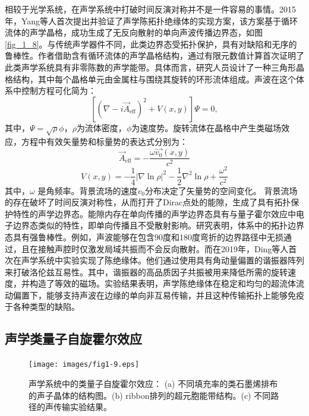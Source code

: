 相较于光学系统，在声学系统中打破时间反演对称并不是一件容易的事情。2015年，Yang等人首次提出并验证了声学陈拓扑绝缘体的实现方案\cite{i1}，该方案基于循环流体的声学晶格，成功生成了无反向散射的单向声波传播边界态，如图\ref{fig_1_8}。与传统声学器件不同，此类边界态受拓扑保护，具有对缺陷和无序的鲁棒性。作者借助含有循环流体的声学晶格结构，通过有限元数值计算首次证明了此类声学系统具有非零陈数的声学能带。具体而言，研究人员设计了一种三角形晶格结构，其中每个晶格单元由金属柱与围绕其旋转的环形流体组成。声波在这个体系中控制方程可化简为：
\begin{equation} \label{eq1-10}
    \left[ (\nabla - i \vec{A}_{\text{eff}})^2 + V(x, y) \right] \Psi = 0,
\end{equation}  
其中，$\Psi = \sqrt{\rho} \phi$，$\rho$为流体密度，$\phi$为速度势。旋转流体在晶格中产生类磁场效应，方程中有效矢量势和标量势的表达式分别为：  
\begin{equation} \label{eq1-11}
    \vec{A}_{\text{eff}} = -\frac{\omega \vec{v_0}(x, y)}{c^2}
\end{equation}
\begin{equation} \label{eq1-12}
    V(x, y) = -\frac{1}{4} \left|\nabla \ln \rho\right|^2 - \frac{1}{2} \nabla^2 \ln \rho + \frac{\omega^2}{c^2}
\end{equation}
其中，\(\omega\) 是角频率。背景流场的速度$v_0$分布决定了矢量势的空间变化。
背景流场的存在破坏了时间反演对称性，从而打开了Dirac点处的能隙，生成了具有拓扑保护特性的声学边界态。能隙内存在单向传播的声学边界态具有与量子霍尔效应中电子边界态类似的特性，即单向传播且不受散射影响。研究表明，体系中的拓扑边界态具有强鲁棒性。例如，声波能够在包含90度和180度弯折的边界路径中无损通过，且在接触声腔时仅激发局域共振而不会反向散射。而在2019年，Ding等人首次在声学系统中实验实现了陈绝缘体\cite{i-add-1}。他们通过使用具有角动量偏置的谐振器阵列来打破洛伦兹互易性。其中，谐振器的高品质因子共振被用来降低所需的旋转速度，并构造了等效的磁场。实验结果表明，声学陈绝缘体在稳定和均匀的超流体流动偏置下，能够支持声波在边缘的单向非互易传输，并且这种传输拓扑上能够免疫于各种类型的缺陷。

\subsection{声学类量子自旋霍尔效应}

\begin{figure}[h!]
    \centering
    \texttt{[image: images/fig1-9.eps]} 
    \caption{声学系统中的类量子自旋霍尔效应\cite{i2}：
    (a) 不同填充率的类石墨烯排布的声子晶体的结构图。(b) ribbon排列的超元胞能带结构。(c) 不同路径的声传输实验结果。
    }
    \label{fig_1_9}
\end{figure}

